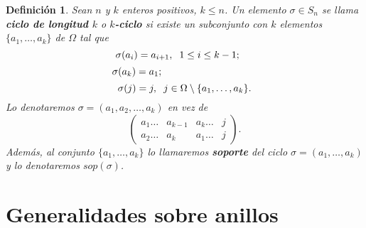 \documentclass[12pt]{article}
\newtheorem{definition}[theorem]{Definición}
\begin{document}
\begin{definition} Sean $n$ y $k$ enteros positivos, $k \leq n$. Un elemento $\sigma \in S_{n}$ se llama \textbf{ciclo de longitud $k$} o \textbf{$k$-ciclo} si existe un subconjunto con $k$ elementos $\lbrace a_{1}, \ldots, a_{k} \rbrace$ de $\Omega$ tal que 
$$\sigma (a_{i}) = a_{i+1}, \hspace{0.2cm} 1 \leq i \leq k-1;\hspace{0.5cm}$$ 
$$\sigma (a_{k}) = a_{1}; \hspace{3.4cm}$$ $$\sigma (j) = j, \hspace{0.2cm} j \in \Omega \setminus \lbrace a_{1}, \ldots , a_{k} \rbrace.$$ 
Lo denotaremos $\sigma = (a_{1}, a_{2}, \ldots, a_{k})$ en vez de $$\left(
\begin{matrix}
a_{1}\ldots &a_{k-1} &a_{k} \ldots &j \\
a_{2}\ldots &a_{k} &a_{1} \ldots &j
\end{matrix}
\right).
$$
Además, al conjunto $\lbrace a_{1}, \ldots, a_{k}\rbrace$ lo llamaremos \textbf{soporte} del ciclo $\sigma = (a_{1}, \ldots, a_{k})$ y lo denotaremos $sop(\sigma)$.
\end{definition}


\section{Generalidades sobre anillos}
\end{document}
